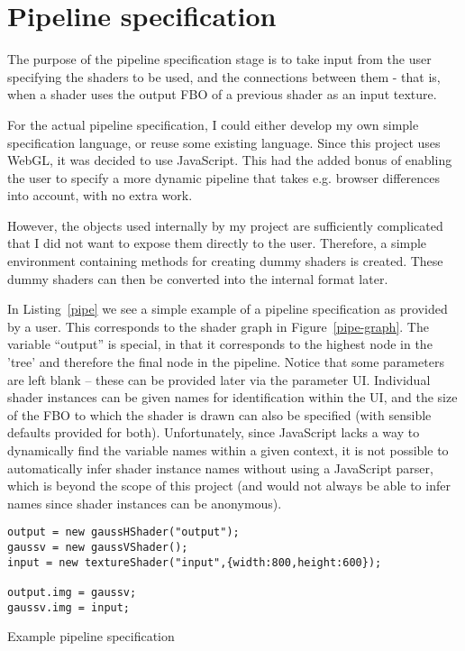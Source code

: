 \documentclass[12pt,twoside,notitlepage]{report}
\begin{document}
\section{Pipeline specification}
The purpose of the pipeline specification stage is to take input from the user specifying the shaders to be used, and the connections between them - that is, when a shader uses the output FBO of a previous shader as an input texture.

For the actual pipeline specification, I could either develop my own simple specification language, or reuse some existing language. Since this project uses WebGL, it was decided to use JavaScript. This had the added bonus of enabling the user to specify a more dynamic pipeline that takes e.g. browser differences into account, with no extra work.

However, the objects used internally by my project are sufficiently complicated that I did not want to expose them directly to the user. Therefore, a simple environment containing methods for creating dummy shaders is created. These dummy shaders can then be converted into the internal format later.

In Listing~\ref{pipe} we see a simple example of a pipeline specification as provided by a user. This corresponds to the shader graph in Figure~\ref{pipe-graph}. The variable ``output'' is special, in that it corresponds to the highest node in the 'tree' and therefore the final node in the pipeline. Notice that some parameters are left blank -- these can be provided later via the parameter UI. Individual shader instances can be given names for identification within the UI, and the size of the FBO to which the shader is drawn can also be specified (with sensible defaults provided for both). Unfortunately, since JavaScript lacks a way to dynamically find the variable names within a given context, it is not possible to automatically infer shader instance names without using a JavaScript parser, which is beyond the scope of this project (and would not always be able to infer names since shader instances can be anonymous).
\begin{listing}[H]
\begin{verbatim}
output = new gaussHShader("output");
gaussv = new gaussVShader();
input = new textureShader("input",{width:800,height:600});

output.img = gaussv;
gaussv.img = input;
\end{verbatim}
\caption{Example pipeline specification\label{pipe}}
\end{listing}
\end{document}
